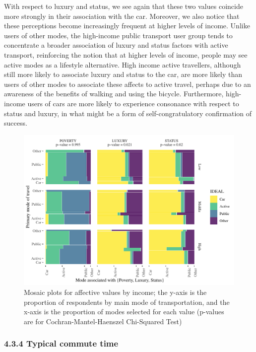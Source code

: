 \documentclass[]{elsarticle} %
\makeatletter
\def\maxwidth{\ifdim\Gin@nat@width>\linewidth\linewidth
\else\Gin@nat@width\fi}
\let\Oldincludegraphics\includegraphics
\renewcommand{\includegraphics}[1]{\Oldincludegraphics[width=\maxwidth]{#1}}
\makeatother
\begin{document}
With respect to luxury and status, we see again that these two values
coincide more strongly in their association with the car. Moreover, we
also notice that these perceptions become increasingly frequent at
higher levels of income. Unlike users of other modes, the high-income
public transport user group tends to concentrate a broader association
of luxury and status factors with active transport, reinforcing the
notion that at higher levels of income, people may see active modes as a
lifestyle alternative. High income active travellers, although still
more likely to associate luxury and status to the car, are more likely
than users of other modes to associate these affects to active travel,
perhaps due to an awareness of the benefits of walking and using the
bicycle. Furthermore, high-income users of cars are more likely to
experience consonance with respect to status and luxury, in what might
be a form of self-congratulatory confirmation of success.

\begin{figure}
\centering
\includegraphics{Dissonance_Santiago_v1_files/figure-latex/figure-mosaic-plots-by-attribute-and-income-1.pdf}
\caption{\label{fig:mosaic-plots-by-income}Mosaic plots for affective
values by income; the y-axis is the proportion of respondents by main
mode of transportation, and the x-axis is the proportion of modes
selected for each value (p-values are for Cochran-Mantel-Haenszel
Chi-Squared Test)}
\end{figure}

\hypertarget{typical-commute-time-1}{%
\subsubsection{4.3.4 Typical commute
time}\label{typical-commute-time-1}}
\end{document}
